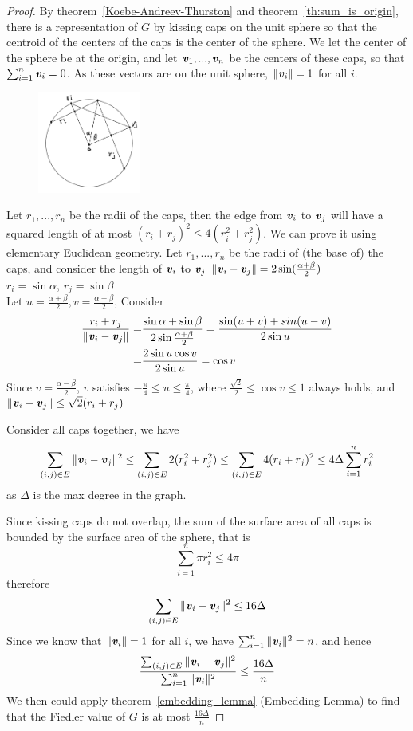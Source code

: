 \begin{proof}
By theorem~\ref{Koebe-Andreev-Thurston} and theorem~\ref{th:sum_is_origin}, there is a representation of $G$ by kissing caps on the unit sphere so that the centroid of the centers of the caps is the center of the sphere. We let the center of the sphere be at the origin, and let $\boldsymbol{\mathit{v}}_1,...,\boldsymbol{\mathit{v}}_n$ be the centers of these caps, so that $\sum_{i=1}^{n}\boldsymbol{\mathit{v}}_i=0$. As these vectors are on the unit sphere, $\|\boldsymbol{\mathit{v}}_i\|=1$ for all $i$.

\begin{figure}[h]
\centering
\includegraphics[width=0.3\textwidth]{figures/pmjh.png}
\label{fig:pmjh}
\caption{}
\end{figure}

 Let $r_1, ..., r_n$ be the radii of the caps, then the edge from $\boldsymbol{\mathit{v}}_i$ to $\boldsymbol{\mathit{v}}_j$ will have a squared length of at most $(r_i+r_j)^2 \leq 4(r_i^2 + r_j^2)$. We can prove it using elementary Euclidean geometry.
Let $r_1, ..., r_n$ be the radii of (the base of) the caps, and consider the length of $\boldsymbol{\mathit{v}}_i$ to $\boldsymbol{\mathit{v}}_j$ 
$\|\boldsymbol{\mathit{v}}_i - \boldsymbol{\mathit{v}}_j\| = 2\sin(\frac{\alpha+\beta}{2})$ \\
$r_i = \sin\alpha$, 
$r_j = \sin\beta$ \\
Let $u = \frac{\alpha +\beta}{2}, v = \frac{\alpha-\beta}{2}$, 
Consider 
\begin{align*}
\frac{r_i+r_j}{\|\boldsymbol{\mathit{v}}_i - \boldsymbol{\mathit{v}}_j\|}= &\frac{\sin\alpha + \sin\beta}{2\sin{\frac{\alpha+\beta}{2}}}= \frac{\sin(u+v)+sin(u-v)}{2\sin u} \\
 =&\frac{2\sin u \cos v}{2\sin u} = \cos v
\end{align*}
Since $v=\frac{\alpha-\beta}{2}$, $v$ satisfies $-\frac{\pi}{4} \leq u \leq \frac{\pi}{4}$, where $ \frac{\sqrt{2}}{2} \leq \cos v \leq 1$ always holds, and $\|\boldsymbol{\mathit{v}}_i - \boldsymbol{\mathit{v}}_j\| \leq \sqrt{2}(r_i + r_j)$

Consider all caps together, we have 
$$
\sum_{(i,j)\in E}\|\boldsymbol{\mathit{v}}_i -\boldsymbol{\mathit{v}}_j\|^2 \leq \sum_{(i,j)\in E} 2(r_i^2+r_j^2)\leq \sum_{(i,j)\in E} 4(r_i+r_j)^2 \leq 4\Delta\sum_{i=1}^{n} r_i^2
$$
as $\Delta$ is the max degree in the graph.

Since kissing caps do not overlap, the sum of the surface area of all caps is bounded by the surface area of the sphere, that is
$$
\sum_{i=1}^{n} \pi r_i^2 \leq 4\pi 
$$
therefore
$$
\sum_{(i,j)\in E}\|\boldsymbol{\mathit{v}}_i -\boldsymbol{\mathit{v}}_j\|^2  \leq 16\Delta
$$
Since we know that $\|\boldsymbol{\mathit{v}}_i\|=1$ for all $i$, we have  $\sum_{i=1}^{n}\|\boldsymbol{\mathit{v}}_i\|^2=n$, and hence
$$
\frac{\sum_{(i,j)\in E}\|\boldsymbol{\mathit{v}}_i -\boldsymbol{\mathit{v}}_j\|^2}{\sum_{i=1}^{n}\|\boldsymbol{\mathit{v}}_i\|^2}  \leq \frac{16\Delta}{n}
$$
We then could apply theorem~\ref{embedding_lemma} (Embedding Lemma) to find that the Fiedler value of $G$ is at most $\frac{16\Delta}{n}$
\end{proof}


